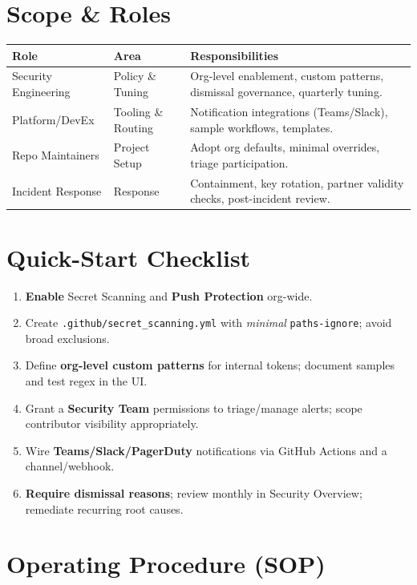 \documentclass[11pt,a4paper,oneside,notitlepage]{article}
\begin{document}
\section{Scope \& Roles}
\begin{table}[htbp]
\centering
\begin{tabular}{@{}llp{8cm}@{}}
\toprule
\textbf{Role} & \textbf{Area} & \textbf{Responsibilities} \\
\midrule
Security Engineering & Policy \& Tuning & Org-level enablement, custom patterns, dismissal governance, quarterly tuning. \\
Platform/DevEx & Tooling \& Routing & Notification integrations (Teams/Slack), sample workflows, templates. \\
Repo Maintainers & Project Setup & Adopt org defaults, minimal overrides, triage participation. \\
Incident Response & Response & Containment, key rotation, partner validity checks, post-incident review. \\
\bottomrule
\end{tabular}
\end{table}

\section{Quick-Start Checklist}
\begin{enumerate}
  \item \textbf{Enable} Secret Scanning and \textbf{Push Protection} org-wide.
  \item Create \texttt{.github/secret\_scanning.yml} with \emph{minimal} \texttt{paths-ignore}; avoid broad exclusions.
  \item Define \textbf{org-level custom patterns} for internal tokens; document samples and test regex in the UI.
  \item Grant a \textbf{Security Team} permissions to triage/manage alerts; scope contributor visibility appropriately.
  \item Wire \textbf{Teams/Slack/PagerDuty} notifications via GitHub Actions and a channel/webhook.
  \item \textbf{Require dismissal reasons}; review monthly in Security Overview; remediate recurring root causes.
\end{enumerate}

\section{Operating Procedure (SOP)}
\end{document}
